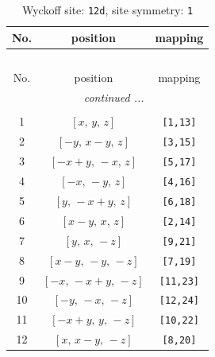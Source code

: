 \documentclass[fleqn,8pt]{jsarticle}
\begin{document}
\renewcommand{\arraystretch}{1.2}
\begin{longtable}{ccc}
\caption{Wyckoff site: {\tt 12d}, site symmetry: {\tt 1}}
 \\
 \hline \hline
No. & position & mapping \\ \hline \endfirsthead

\multicolumn{2}{l}{\tablename\ \thetable{}} \\
 \hline \hline
No. & position & mapping \\ \hline \endhead

 \hline \hline
\multicolumn{2}{r}{\footnotesize\it continued ...} \\ \endfoot

 \hline \hline
\multicolumn{2}{r}{} \\ \endlastfoot

1 & $\left[ x,\, y,\, z \right]$ & {\tt [1,13]} \\ \hline
2 & $\left[ - y,\, x - y,\, z \right]$ & {\tt [3,15]} \\ \hline
3 & $\left[ - x + y,\, - x,\, z \right]$ & {\tt [5,17]} \\ \hline
4 & $\left[ - x,\, - y,\, z \right]$ & {\tt [4,16]} \\ \hline
5 & $\left[ y,\, - x + y,\, z \right]$ & {\tt [6,18]} \\ \hline
6 & $\left[ x - y,\, x,\, z \right]$ & {\tt [2,14]} \\ \hline
7 & $\left[ y,\, x,\, - z \right]$ & {\tt [9,21]} \\ \hline
8 & $\left[ x - y,\, - y,\, - z \right]$ & {\tt [7,19]} \\ \hline
9 & $\left[ - x,\, - x + y,\, - z \right]$ & {\tt [11,23]} \\ \hline
10 & $\left[ - y,\, - x,\, - z \right]$ & {\tt [12,24]} \\ \hline
11 & $\left[ - x + y,\, y,\, - z \right]$ & {\tt [10,22]} \\ \hline
12 & $\left[ x,\, x - y,\, - z \right]$ & {\tt [8,20]} \\
\end{longtable}
\end{document}
